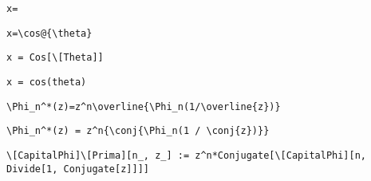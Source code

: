 \newsavebox\DAT
\begin{lrbox}{\DAT}
 \begin{minipage}[t]{0.82\textwidth}
  \lstinline[language={[latex]TeX},mathescape,breaklines=true]"x="
 \end{minipage}
\end{lrbox}
\newsavebox\DAST
\begin{lrbox}{\DAST}
 \begin{minipage}[t]{0.82\textwidth}
  \lstinline[language={[latex]TeX},mathescape,breaklines=true]"x=\cos@{\theta}"
 \end{minipage}
\end{lrbox}
\newsavebox\DAMM
\begin{lrbox}{\DAMM}
 \begin{minipage}[t]{0.82\textwidth}
  \lstinline[language={[latex]TeX},mathescape,breaklines=true]"x = Cos[\[Theta]]"
 \end{minipage}
\end{lrbox}
\newsavebox\DAMA
\begin{lrbox}{\DAMA}
 \begin{minipage}[t]{0.82\textwidth}
  \lstinline[language={[latex]TeX},mathescape,breaklines=true]"x = cos(theta)"
 \end{minipage}
\end{lrbox}
\newsavebox\DBT
\begin{lrbox}{\DBT}
 \begin{minipage}[t]{0.82\textwidth}
  \lstinline[language={[latex]TeX},mathescape,breaklines=true]"\Phi_n^*(z)=z^n\overline{\Phi_n(1/\overline{z})}"
 \end{minipage}
\end{lrbox}
\newsavebox\DBST
\begin{lrbox}{\DBST}
 \begin{minipage}[t]{0.82\textwidth}
  \lstinline[language={[latex]TeX},mathescape,breaklines=true]"\Phi_n^*(z) = z^n{\conj{\Phi_n(1 / \conj{z})}}"
 \end{minipage}
\end{lrbox}
\newsavebox\DBMM
\begin{lrbox}{\DBMM}
 \begin{minipage}[t]{0.82\textwidth}
  \lstinline[language={[latex]TeX},mathescape,breaklines=true]"\[CapitalPhi]\[Prima][n_, z_] := z^n*Conjugate[\[CapitalPhi][n, Divide[1, Conjugate[z]]]]"
 \end{minipage}
\end{lrbox}
